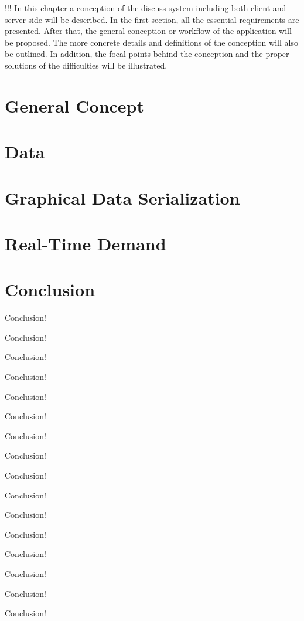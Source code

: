 !!! In this chapter a conception of the discuss system including both client and server side will be described. In the first section, all the essential requirements are presented. After that, the general conception or workflow of the application will be proposed. The more concrete details and definitions of the conception will also be outlined. In addition, the focal points behind the conception and the proper solutions of the difficulties will be illustrated.


% 
\section{General Concept}

\section{Data}\label{sec:data-concept}

\section{Graphical Data Serialization}\label{sec:graphical-data-serialization-concept}

\section{Real-Time Demand}\label{sec:realtime-concept}


% 

\section{Conclusion}


Conclusion!

Conclusion!

Conclusion!

Conclusion!

Conclusion!

Conclusion!

Conclusion!

Conclusion!


Conclusion!

Conclusion!

Conclusion!

Conclusion!


Conclusion!

Conclusion!

Conclusion!

Conclusion!


